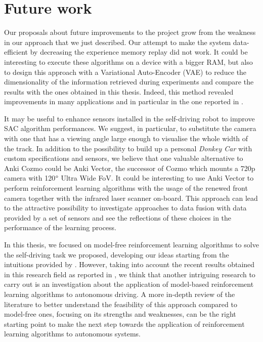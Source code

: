 \section{Future work}

Our proposals about future improvements to the project grow from the weakness in our approach that we just described.
Our attempt to make the system data-efficient by decreasing the experience memory replay did not work.
It could be interesting to execute these algorithms on a device with a bigger RAM, but also to design this approach with a Variational Auto-Encoder (VAE) \cite{kingma2013auto} to reduce the dimensionality of the information retrieved during experiments and compare the results with the ones obtained in this thesis.
Indeed, this method revealed improvements in many applications and in particular in the one reported in \cite{kendall2018learning,kendall2019learning}.

It may be useful to enhance sensors installed in the self-driving robot to improve SAC algorithm performances.
We suggest, in particular, to substitute the camera with one that has a viewing angle large enough to visualise the whole width of the track.
In addition to the possibility to build up a personal \textit{Donkey Car} with custom specifications and sensors, we believe that one valuable alternative to Anki Cozmo could be Anki Vector, the successor of Cozmo which mounts a 720p camera with 120$\degree$ Ultra Wide FoV.
It could be interesting to use Anki Vector to perform reinforcement learning algorithms with the usage of the renewed front camera together with the infrared laser scanner on-board. This approach can lead to the attractive possibility to investigate approaches to data fusion with data provided by a set of sensors and see the reflections of these choices in the performance of the learning process.

In this thesis, we focused on model-free reinforcement learning algorithms to solve the self-driving task we proposed, developing our ideas starting from the intuitions provided by \cite{kendall2018learning,kendall2019learning}.
However, taking into account the recent results obtained in this research field as reported in \cite{hawke2019urban,wayve2019learned}, we think that another intriguing research to carry out is an investigation about the application of model-based reinforcement learning algorithms to autonomous driving.
A more in-depth review of the literature to better understand the feasibility of this approach compared to model-free ones, focusing on its strengths and weaknesses, can be the right starting point to make the next step towards the application of reinforcement learning algorithms to autonomous systems.